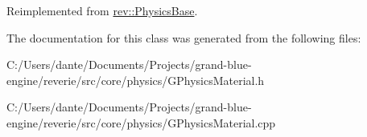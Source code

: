 Reimplemented from \mbox{\hyperlink{classrev_1_1_physics_base_acf58cc81cff2ca957dcc68fe9a9a84a1}{rev\+::\+Physics\+Base}}.



The documentation for this class was generated from the following files\+:\begin{DoxyCompactItemize}
\item 
C\+:/\+Users/dante/\+Documents/\+Projects/grand-\/blue-\/engine/reverie/src/core/physics/G\+Physics\+Material.\+h\item 
C\+:/\+Users/dante/\+Documents/\+Projects/grand-\/blue-\/engine/reverie/src/core/physics/G\+Physics\+Material.\+cpp\end{DoxyCompactItemize}
